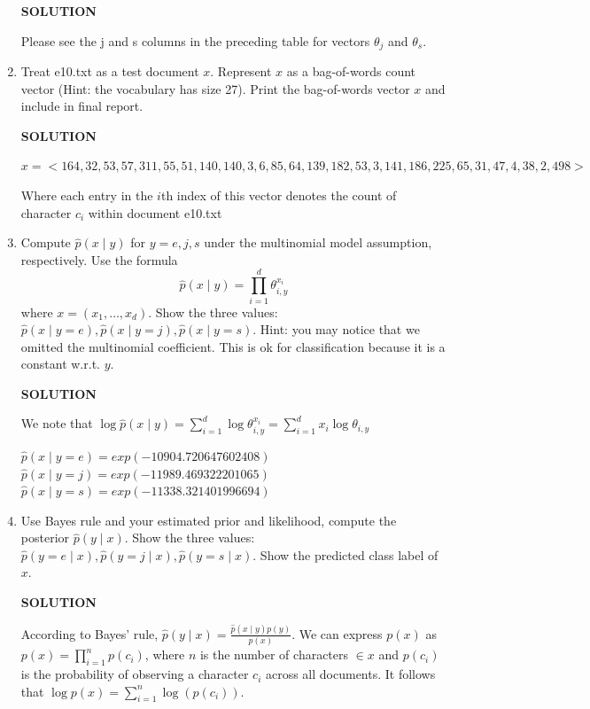 \documentclass[a4paper]{article}
\theoremstyle{definition}
\begin{document}
\begin{enumerate}
\textbf{SOLUTION}

Please see the j and s columns in the preceding table for vectors $\theta_j$ and $\theta_s$.

\item
Treat e10.txt as a test document $x$.
Represent $x$ as a bag-of-words count vector (Hint: the vocabulary has size 27).
Print the bag-of-words vector $x$ and include in final report.

\textbf{SOLUTION}

$x = <164, 32, 53, 57, 311, 55, 51, 140, 140, 3, 6, 85, 64, 139, 182, 53, 3, 141, 186, 225, 65, 31, 47, 4, 38, 2, 498>$

Where each entry in the $i$th index of this vector denotes the count of character $c_i$ within document e10.txt

\item
Compute $\hat p(x \mid y)$ for $y=e, j, s$ under the multinomial model assumption, respectively.
Use the formula
$$\hat p(x \mid y) = \prod_{i=1}^d \theta_{i, y}^{x_i}$$
where $x=(x_1, \ldots, x_d)$.
Show the three values: $\hat p(x \mid y=e), \hat p(x \mid y=j), \hat p(x \mid y=s)$.
Hint: you may notice that we omitted the multinomial coefficient.  This is ok for classification because it is a constant w.r.t. $y$.

\textbf{SOLUTION}

We note that $\log{\hat p(x \mid y)} = \sum_{i=1}^d \log{\theta_{i, y}^{x_i}} = \sum_{i=1}^{d}{ x_i \log{\theta_{i, y}}}$

$\hat p(x \mid y=e) = exp(-10904.720647602408)$ \\ 
$\hat p(x \mid y=j) = exp(-11989.469322201065)$ \\
$\hat p(x \mid y=s) = exp(-11338.321401996694)$ \\


\item
Use Bayes rule and your estimated prior and likelihood, compute the posterior $\hat p(y \mid x)$.
Show the three values: $\hat p(y=e \mid x), \hat p(y=j \mid x), \hat p(y=s \mid x)$.
Show the predicted class label of $x$.

\textbf{SOLUTION}

According to Bayes' rule, $\hat p(y \mid x) = \frac{\hat p(x \mid y) p(y)}{p(x)}$. We can express $p(x)$ as $p(x) = \prod_{i=1}^{n}{p(c_i)}$, where $n$ is the number of characters $\in x$ and $p(c_i)$ is the probability of observing a character $c_i$ across all documents. 
It follows that $\log{p(x)} = \sum_{i=1}^{n}{\log(p(c_i))}$.


\end{enumerate}
\end{document}
